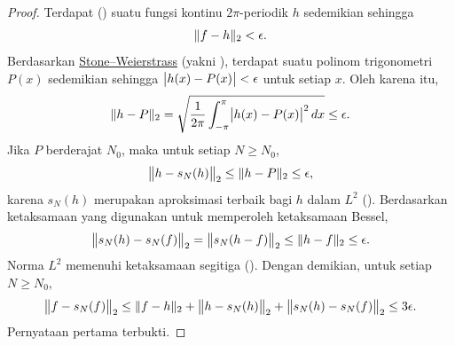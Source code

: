 \begin{proof}
Terdapat ()
suatu fungsi kontinu $2\pi$-periodik $h$ sedemikian sehingga
\begin{equation*}
\lVert {f-h} \rVert_2 < \epsilon .
\end{equation*}
Berdasarkan \hyperref[thm:SWcomplex]{Stone--Weierstrass}
(yakni ),
terdapat suatu polinom trigonometri $P(x)$
sedemikian sehingga
$\bigl\lvert {h(x) - P(x)} \bigr\rvert < \epsilon$ untuk setiap $x$.
Oleh karena itu,
\begin{equation*}
\lVert {h-P} \rVert_2
=
\sqrt{
\frac{1}{2\pi}
\int_{-\pi}^{\pi}
\bigl\lvert {h(x)-P(x)} \bigr\rvert^2
\,
dx
}
\leq \epsilon.
\end{equation*}
Jika $P$ berderajat $N_0$, maka untuk setiap $N \geq N_0$,
\begin{equation*}
\bigl\lVert {h-s_N(h)} \bigr\rVert_2 \leq \lVert {h-P} \rVert_2 \leq \epsilon ,
\end{equation*}
karena $s_N(h)$ merupakan aproksimasi terbaik bagi $h$ dalam $L^2$ ().
Berdasarkan ketaksamaan yang digunakan untuk memperoleh ketaksamaan Bessel,
\begin{equation*}
\bigl\lVert {s_N(h)-s_N(f)} \bigr\rVert_2
=
\bigl\lVert {s_N(h-f)} \bigr\rVert_2
\leq
\lVert {h-f} \rVert_2 \leq \epsilon .
\end{equation*}
Norma $L^2$ memenuhi ketaksamaan segitiga
().
Dengan demikian, untuk setiap $N \geq N_0$,
\begin{equation*}
\bigl\lVert {f-s_N(f)} \bigr\rVert_2
\leq
\lVert {f-h} \rVert_2
+
\bigl\lVert {h-s_N(h)} \bigr\rVert_2
+
\bigl\lVert {s_N(h)-s_N(f)} \bigr\rVert_2
\leq 3\epsilon .
\end{equation*}
Pernyataan pertama terbukti.


\end{proof}
